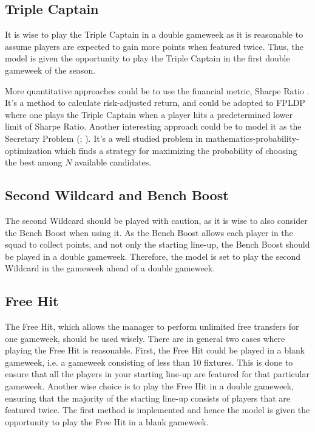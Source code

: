 \subsection{Triple Captain}
It is wise to play the Triple Captain in a double gameweek as it is reasonable to assume players are expected to gain more points when featured twice. Thus, the model is given the opportunity to play the Triple Captain in the first double gameweek of the season. 

\newpar

More quantitative approaches could be to use the financial metric, Sharpe Ratio \citep{Sharpe}. It's a method to calculate risk-adjusted return, and could be adopted to FPLDP where one plays the Triple Captain when a player hits a predetermined lower limit of Sharpe Ratio. Another interesting approach could be to model it as the Secretary Problem (\cite{Lindley}; \cite{Bruss}). It's a well studied problem in mathematics-probability-optimization which finds a strategy for maximizing the probability of choosing the best among $N$ available candidates.  

\subsection{Second Wildcard and Bench Boost}
The second Wildcard should be played with caution, as it is wise to also consider the Bench Boost when using it. As the Bench Boost allows each player in the squad to collect points, and not only the starting line-up, the Bench Boost should be played in a double gameweek. Therefore, the model is set to play the second Wildcard in the gameweek ahead of a double gameweek.

\subsection{Free Hit}
The Free Hit, which allows the manager to perform unlimited free transfers for one gameweek, should be used wisely. There are in general two cases where playing the Free Hit is reasonable. First, the Free Hit could be played in a blank gameweek, i.e. a gameweek consisting of less than 10 fixtures. This is done to ensure that all the players in your starting line-up are featured for that particular gameweek. Another wise choice is to play the Free Hit in a double gameweek, ensuring that the majority of the starting line-up consists of players that are featured twice. The first method is implemented and hence the model is given the opportunity to play the Free Hit in a blank gameweek. 


